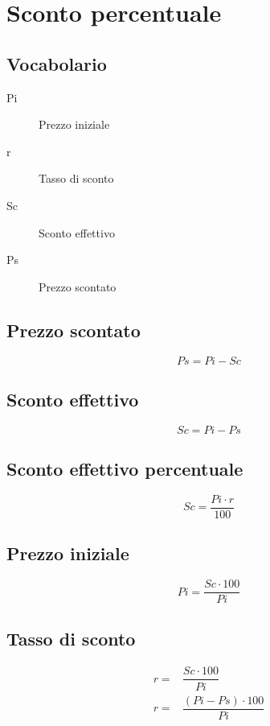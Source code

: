 
\chapter{Sconto percentuale}
\section{Vocabolario}
\begin{description}
	\item[Pi] Prezzo iniziale
	\item[r] Tasso di sconto
	\item[Sc] Sconto effettivo
	\item[Ps] Prezzo scontato
\end{description}\section{Prezzo scontato}
\begin{equation}
Ps=Pi-Sc
\end{equation}
\section{Sconto effettivo}
\begin{equation}
Sc=Pi-Ps
\end{equation}

\section{Sconto effettivo percentuale}
\begin{equation}
Sc=\dfrac{Pi\cdot r}{100}
\end{equation}
\section{Prezzo iniziale}
\begin{equation}
Pi=\dfrac{Sc\cdot 100}{Pi}
\end{equation}

\section{Tasso di sconto}
\begin{align}
r=&\dfrac{Sc\cdot 100}{Pi}\\
r=&\dfrac{(Pi-Ps)\cdot 100}{Pi}
\end{align}
